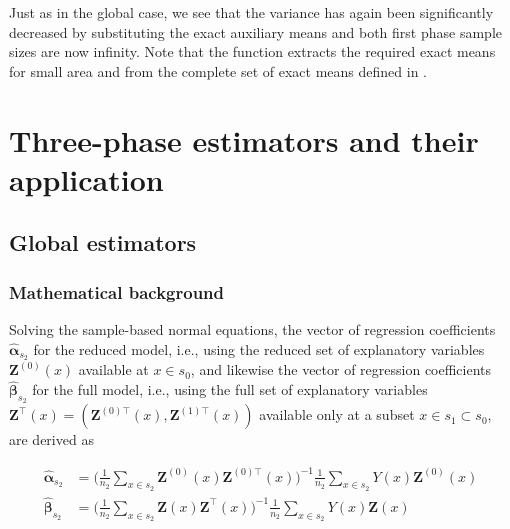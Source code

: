 Just as in the global case, we see that the variance has again been significantly decreased by substituting the exact auxiliary means and both first phase sample sizes are now infinity. Note that the function extracts the required exact means for small area  and  from the complete set of exact means defined in .

\newpage

\section{Three-phase estimators and their application}
\label{sec:threephase_and_appl}

\subsection{Global estimators}
\label{sec:glob_est_3p}


\subsubsection{Mathematical background}


Solving the sample-based normal equations, the vector of regression coefficients $\hat{\pmb{\alpha}}_{s_2}$ for the reduced model, i.e., using the reduced set of explanatory variables $\pmb{Z}^{(0)}(x)$ available at $x \in s_0$, and likewise the vector of regression coefficients $\hat{\pmb{\beta}}_{s_2}$ for the full model, i.e., using the full set of explanatory variables $\pmb{Z}^{\top}(x)=(\pmb{Z}^{(0)\top}(x),\pmb{Z}^{(1)\top}(x))$ available only at a subset $x \in s_1 \subset s_0$, are derived as

\begin{subequations}\label{eq:normequ_3p}
\begin{align}
\hat{\pmb{\alpha}}_{s_2}&=\Big(\frac{1}{n_2}\sum_{x\in{s}_2}\pmb{Z}^{(0)}(x)\pmb{Z}^{(0)\top}(x)
\Big)^{-1}\frac{1}{n_2}\sum_{x\in{s}_2}Y(x)\pmb{Z}^{(0)}(x)  \label{eq:normequ_redmod} \\
\hat{\pmb{\beta}}_{s_2}&=\Big(\frac{1}{n_2}\sum_{x\in{s}_2}\pmb{Z}(x)\pmb{Z}^{\top}(x)
\Big)^{-1}\frac{1}{n_2}\sum_{x\in{s}_2}Y(x)\pmb{Z}(x) \label{eq:normequ_fullmod}
\end{align}
\end{subequations}

